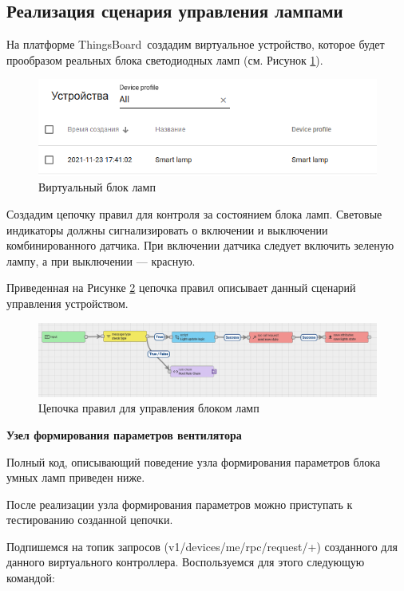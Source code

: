 \documentclass[utf8x]{G7-32} %
\newcommand{\pathToScriptsFolder}{/home/denilai/Documents/repos/latex/scripts}
\newcommand{\tb}{ThingsBoard~}
\begin{document}
\subsection{Реализация сценария управления лампами}


На платформе \tb создадим виртуальное устройство, которое будет прообразом реальных блока светодиодных ламп (см. Рисунок \ref{fig:dev-2}).


\begin{figure}[h!]
	\centering
	\includegraphics[width=0.5\linewidth]{images/dev-2}
	\caption{Виртуальный блок ламп}
	\label{fig:dev-2}
\end{figure}


Создадим цепочку правил для контроля за состоянием блока ламп. Световые индикаторы должны сигнализировать о включении и выключении комбинированного датчика. При включении датчика следует включить зеленую лампу, а при выключении --- красную. 

Приведенная на Рисунке \ref{fig:chains-2} цепочка правил описывает данный сценарий управления устройством.
\begin{figure}[h!]
	\centering
	\includegraphics[width=0.6\linewidth]{images/chains-2}
	\caption{Цепочка правил для управления блоком ламп}
	\label{fig:chains-2}
\end{figure}


\textbf{Узел формирования параметров вентилятора}

Полный код, описывающий поведение узла формирования параметров блока умных ламп приведен ниже.




После реализации узла формирования параметров можно приступать к тестированию созданной цепочки. 

Подпишемся на топик запросов (v1/devices/me/rpc/request/+) созданного для данного
виртуального контроллера. Воспользуемся для этого следующую командой:
\end{document}
